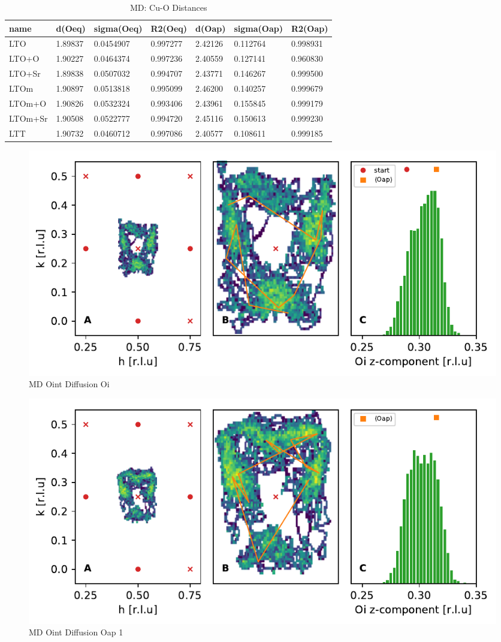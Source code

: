 \begin{table}
	\centering
	\begin{tabular}{lllllll}
		\toprule
			name &   d(Oeq) & sigma(Oeq) &  R2(Oeq) &   d(Oap) & sigma(Oap) &  R2(Oap) \\
		\midrule
			 LTO &  1.89837 &  0.0454907 &  0.997277 &  2.42126 &   0.112764 &  0.998931 \\
		   LTO+O &  1.90227 &  0.0464374 &  0.997236 &  2.40559 &   0.127141 &  0.960830 \\
		  LTO+Sr &  1.89838 &  0.0507032 &  0.994707 &  2.43771 &   0.146267 &  0.999500 \\
			LTOm &  1.90897 &  0.0513818 &  0.995099 &  2.46200 &   0.140257 &  0.999679 \\
		  LTOm+O &  1.90826 &  0.0532324 &  0.993406 &  2.43961 &   0.155845 &  0.999179 \\
		 LTOm+Sr &  1.90508 &  0.0522777 &  0.994720 &  2.45116 &   0.150613 &  0.999230 \\
			 LTT &  1.90732 &  0.0460712 &  0.997086 &  2.40577 &   0.108611 &  0.999185 \\
		\bottomrule
		\end{tabular}
	\caption{MD: Cu-O Distances}
	\label{tab:md_cu_o_distances}
\end{table}

\begin{figure}
	\centering
	\includegraphics[width=\textwidth]{fig/md/diffusion1.pdf}
	\caption[MD Oint Diffusion Oi]{MD Oint Diffusion Oi}
	\label{fig:md_diffusion1}
\end{figure}

\begin{figure}
	\centering
	\includegraphics[width=\textwidth]{fig/md/diffusion2.pdf}
	\caption[MD Oint Diffusion Oap 1]{MD Oint Diffusion Oap 1}
	\label{fig:md_diffusion2}
\end{figure}

